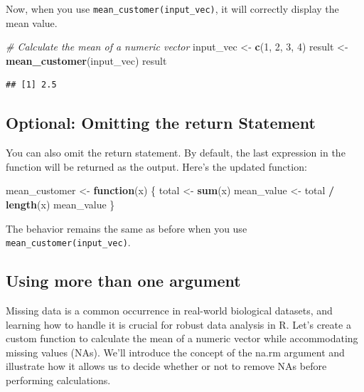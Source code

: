 \documentclass[
]{book}
\newenvironment{Shaded}{\begin{snugshade}}{\end{snugshade}}
\newcommand{\CommentTok}[1]{\textcolor[rgb]{0.56,0.35,0.01}{\textit{#1}}}
\newcommand{\ControlFlowTok}[1]{\textcolor[rgb]{0.13,0.29,0.53}{\textbf{#1}}}
\newcommand{\DecValTok}[1]{\textcolor[rgb]{0.00,0.00,0.81}{#1}}
\newcommand{\FunctionTok}[1]{\textcolor[rgb]{0.13,0.29,0.53}{\textbf{#1}}}
\newcommand{\NormalTok}[1]{#1}
\newcommand{\OtherTok}[1]{\textcolor[rgb]{0.56,0.35,0.01}{#1}}
\newcommand{\SpecialCharTok}[1]{\textcolor[rgb]{0.81,0.36,0.00}{\textbf{#1}}}
\begin{document}
Now, when you use \texttt{mean\_customer(input\_vec)}, it will correctly display the mean value.

\begin{Shaded}
\begin{Highlighting}[]
\CommentTok{\# Calculate the mean of a numeric vector}
\NormalTok{input\_vec }\OtherTok{\textless{}{-}} \FunctionTok{c}\NormalTok{(}\DecValTok{1}\NormalTok{, }\DecValTok{2}\NormalTok{, }\DecValTok{3}\NormalTok{, }\DecValTok{4}\NormalTok{)}
\NormalTok{result }\OtherTok{\textless{}{-}} \FunctionTok{mean\_customer}\NormalTok{(input\_vec)}
\NormalTok{result}
\end{Highlighting}
\end{Shaded}

\begin{verbatim}
## [1] 2.5
\end{verbatim}

\hypertarget{optional-omitting-the-return-statement}{%
\subsection{Optional: Omitting the return Statement}\label{optional-omitting-the-return-statement}}

You can also omit the return statement. By default, the last expression in the function will be returned as the output. Here's the updated function:

\begin{Shaded}
\begin{Highlighting}[]
\NormalTok{mean\_customer }\OtherTok{\textless{}{-}} \ControlFlowTok{function}\NormalTok{(x) \{}
\NormalTok{  total }\OtherTok{\textless{}{-}} \FunctionTok{sum}\NormalTok{(x)}
\NormalTok{  mean\_value }\OtherTok{\textless{}{-}}\NormalTok{ total }\SpecialCharTok{/} \FunctionTok{length}\NormalTok{(x)}
\NormalTok{  mean\_value}
\NormalTok{\}}
\end{Highlighting}
\end{Shaded}

The behavior remains the same as before when you use \texttt{mean\_customer(input\_vec)}.

\hypertarget{using-more-than-one-argument}{%
\subsection{Using more than one argument}\label{using-more-than-one-argument}}

Missing data is a common occurrence in real-world biological datasets, and learning how to handle it is crucial for robust data analysis in R. Let's create a custom function to calculate the mean of a numeric vector while accommodating missing values (NAs). We'll introduce the concept of the na.rm argument and illustrate how it allows us to decide whether or not to remove NAs before performing calculations.
\end{document}
